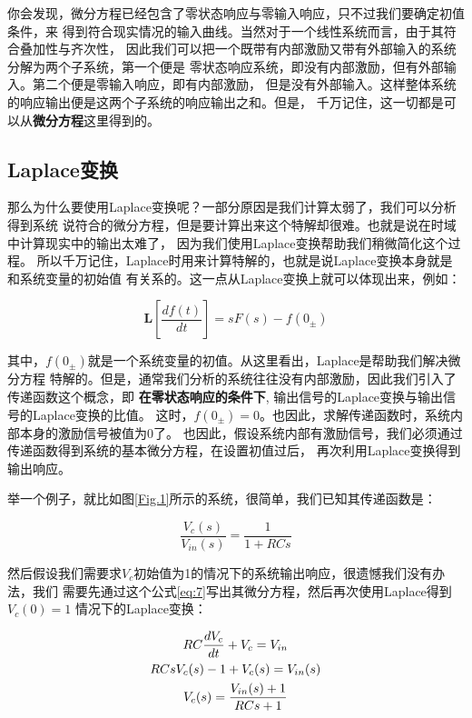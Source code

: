 \documentclass{ctexart}
\begin{document}
你会发现，微分方程已经包含了零状态响应与零输入响应，只不过我们要确定初值条件，来
得到符合现实情况的输入曲线。当然对于一个线性系统而言，由于其符合叠加性与齐次性，
因此我们可以把一个既带有内部激励又带有外部输入的系统分解为两个子系统，第一个便是
零状态响应系统，即没有内部激励，但有外部输入。第二个便是零输入响应，即有内部激励，
但是没有外部输入。这样整体系统的响应输出便是这两个子系统的响应输出之和。但是，
千万记住，这一切都是可以从\textbf{微分方程}这里得到的。


\subsection*{Laplace变换}
那么为什么要使用Laplace变换呢？一部分原因是我们计算太弱了，我们可以分析得到系统
说符合的微分方程，但是要计算出来这个特解却很难。也就是说在时域中计算现实中的输出太难了，
因为我们使用Laplace变换帮助我们稍微简化这个过程。
所以千万记住，Laplace时用来计算特解的，也就是说Laplace变换本身就是和系统变量的初始值
有关系的。这一点从Laplace变换上就可以体现出来，例如：

\begin{equation}
    \mathbf{L}[\frac{d f(t)}{dt}] = s F(s) - f(0_{\pm})
    \label{eq:6}
\end{equation}

其中，$f(0_{\pm})$就是一个系统变量的初值。从这里看出，Laplace是帮助我们解决微分方程
特解的。但是，通常我们分析的系统往往没有内部激励，因此我们引入了传递函数这个概念，即
\textbf{在零状态响应的条件下}, 输出信号的Laplace变换与输出信号的Laplace变换的比值。
这时，$f(0_{\pm})=0$。也因此，求解传递函数时，系统内部本身的激励信号被值为0了。
也因此，假设系统内部有激励信号，我们必须通过传递函数得到系统的基本微分方程，在设置初值过后，
再次利用Laplace变换得到输出响应。

举一个例子，就比如图\ref{Fig.1}所示的系统，很简单，我们已知其传递函数是：

\begin{equation}
    \frac{V_c(s)}{V_{in}(s)} = \frac{1}{1 + RCs}
    \label{eq:7}
\end{equation}

然后假设我们需要求$V_{c}$初始值为1的情况下的系统输出响应，很遗憾我们没有办法，我们
需要先通过这个公式\eqref{eq:7}写出其微分方程，然后再次使用Laplace得到$V_{c}(0)=1$
情况下的Laplace变换：

\begin{gather}
    RC \frac{d V_c}{d t} + V_c = V_{in} \notag\\
    RCs V_c(s) - 1 + V_c(s) = V_{in}(s)     \\
    V_c(s) = \frac{V_{in}(s) + 1}{RCs + 1} \notag
    \label{eq:8}
\end{gather}
\end{document}
